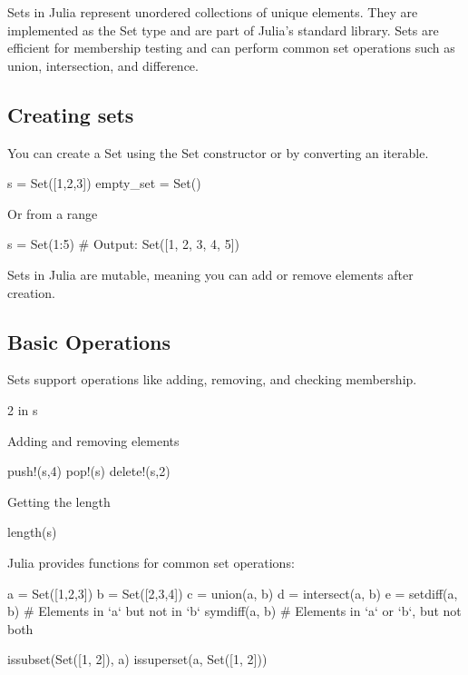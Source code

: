 \documentclass{report}
\begin{document}
     \pagebreak 
     \bigbreak \noindent 
     Sets in Julia represent unordered collections of unique elements. They are implemented as the Set type and are part of Julia's standard library. Sets are efficient for membership testing and can perform common set operations such as union, intersection, and difference.
     \bigbreak \noindent 
     \subsection{Creating sets}
     \bigbreak \noindent 
     You can create a Set using the Set constructor or by converting an iterable.
     \bigbreak \noindent 
     \begin{jlcode}
         s = Set([1,2,3])
         empty_set = Set()
     \end{jlcode}
     \bigbreak \noindent 
     Or from a range
     \bigbreak \noindent 
     \begin{jlcode}
     s = Set(1:5) # Output: Set([1, 2, 3, 4, 5])
     \end{jlcode}
     \bigbreak \noindent 
      Sets in Julia are mutable, meaning you can add or remove elements after creation.


     \bigbreak \noindent 
     \subsection{Basic Operations}
     \bigbreak \noindent 
     Sets support operations like adding, removing, and checking membership.
     \bigbreak \noindent 
     \begin{jlcode}
     2 in s
     \end{jlcode}
     \bigbreak \noindent 
     Adding and removing elements
     \bigbreak \noindent 
     \begin{jlcode}
     push!(s,4)
     pop!(s)
     delete!(s,2)
     \end{jlcode}
     \bigbreak \noindent 
     Getting the length
     \bigbreak \noindent 
     \begin{jlcode}
     length(s)
     \end{jlcode}
     \bigbreak \noindent 
     Julia provides functions for common set operations:
     \bigbreak \noindent 
     \begin{jlcode}
         a = Set([1,2,3])
         b = Set([2,3,4])
         c = union(a, b)
         d = intersect(a, b)
         e = setdiff(a, b)  # Elements in `a` but not in `b`
         symdiff(a, b)  # Elements in `a` or `b`, but not both

         issubset(Set([1, 2]), a)
         issuperset(a, Set([1, 2]))
     \end{jlcode}
     \bigbreak \noindent 
\end{document}
